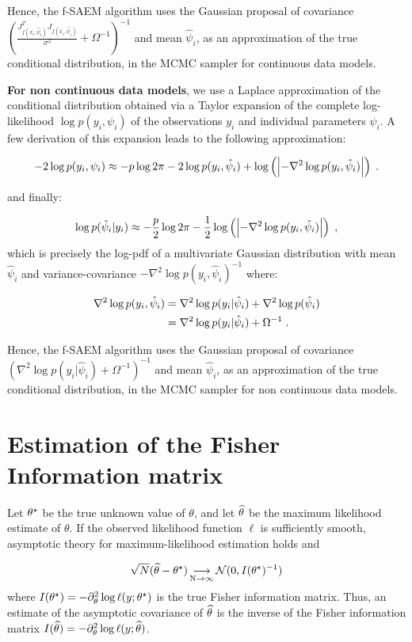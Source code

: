 Hence, the f-SAEM algorithm uses the Gaussian proposal of covariance $\left(\frac{ J_{f(x_{i},\hat{\psi}_i)}^T J_{f(x_{i},\hat{\psi}_i)} }{\sigma^2} + \Omega^{-1}\right)^{-1}$ and  mean $\hat{\psi}_i$, as an approximation of the true conditional distribution, in the MCMC sampler for continuous data models.


\textbf{For non continuous data models}, we use a Laplace approximation of the conditional distribution obtained via a Taylor expansion of the complete log-likelihood $\log p(y_i,\psi_i)$ of the observations $y_i$ and individual parameters $\psi_i$.
A few derivation of this expansion leads to the following approximation:

$$
-2\log p(y_i,\psi_i)  \approx -p\log2\pi - 2\log p(y_i,\hat{\psi}_i) + \log \left(\left|-\nabla^2 \log p(y_i,\hat{\psi}_i)\right|\right)\;.
$$

and finally:

 $$
\log p(\hat{\psi}_i|y_i) \approx -\frac{p}{2}\log2\pi  -\frac{1}{2}\log \left(\left|-\nabla^2 \log p(y_i,\hat{\psi}_i) \right|\right)\;,
$$
which is precisely the log-pdf of a multivariate Gaussian distribution with mean $\hat{\psi}_i$ and  variance-covariance $-\nabla^2 \log p(y_i,\hat{\psi}_i)^{-1}$ where:

\begin{align}
\nabla^2 \log p(y_i,\hat{\psi}_i) &= \nabla^2 \log p(y_i|\hat{\psi}_i) + \nabla^2 \log p(\hat{\psi}_i) \\ \notag
&= \nabla^2 \log p(y_i|\hat{\psi}_i) + \Omega^{-1}\;.\notag
\end{align}

Hence, the f-SAEM algorithm uses the Gaussian proposal of covariance $\left( \nabla^2 \log p(y_i|\hat{\psi}_i) + \Omega^{-1}\right)^{-1}$ and mean $\hat{\psi}_i$, as an approximation of the true conditional distribution, in the MCMC sampler for non continuous data models.

\section{Estimation of the Fisher Information matrix} \label{sec_fish} Let ${\theta^\star}$ be the true unknown value of $\theta$, and let ${\widehat{\theta}}$ be the maximum likelihood estimate of $\theta$. If the observed likelihood function $\ell$ is sufficiently smooth, asymptotic theory for maximum-likelihood estimation holds and

\begin{equation}
\sqrt{N}({\widehat{\theta}}-{\theta^\star}) \mathop{\longrightarrow}\limits_{\mathrm{N\to \infty}}^{\mathrm{}} {\mathcal N}(0,I({\theta^\star})^{-1})
\end{equation}
where $I({\theta^\star})=- \partial^2_\theta \log \ell(y;{\theta^\star})$ is the true Fisher information matrix. Thus, an estimate of the asymptotic covariance of ${\widehat{\theta}}$ is the  inverse of the Fisher information matrix $I({\widehat{\theta}})=- \partial^2_\theta \log \ell(y;{\widehat{\theta}})$.

